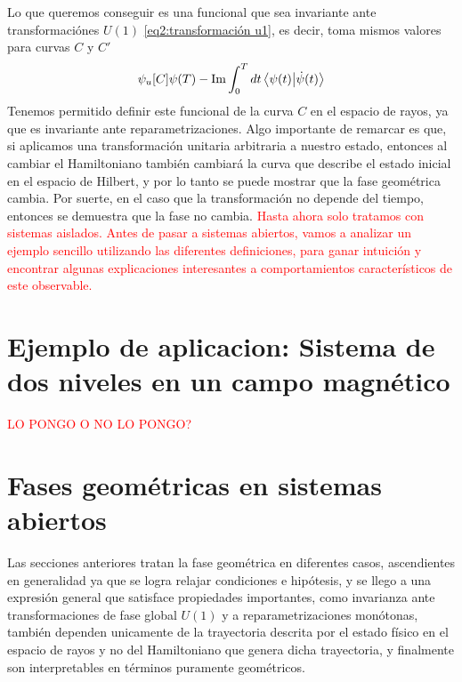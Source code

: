 Lo que queremos conseguir es una funcional que sea invariante ante transformaciónes $U(1)$ \ref{eq2:transformación u1}, es decir, toma mismos valores para curvas $C$ y $C'$
\begin{equation} \label{eq2:fg cinematica unitaria}
    \psi_u[C] \def \arg \braket{\psi(0)}{\psi(T)} - \Im \int_0^T dt \braket{\psi(t)}{\dot \psi(t)}
\end{equation}
Tenemos permitido definir este funcional de la curva $C$ en el espacio de rayos, ya que es invariante ante reparametrizaciones. Algo importante de remarcar es que, si aplicamos una transformación unitaria arbitraria a nuestro estado, entonces al cambiar el Hamiltoniano también cambiará la curva que describe el estado inicial en el espacio de Hilbert, y por lo tanto se puede mostrar que la fase geométrica cambia. Por suerte, en el caso que la transformación no depende del tiempo, entonces se demuestra que la fase no cambia. 
\newline
\textcolor{red}{Hasta ahora solo tratamos con sistemas aislados. Antes de pasar a sistemas abiertos, vamos a analizar un ejemplo sencillo utilizando las diferentes definiciones, para ganar intuición y encontrar algunas explicaciones interesantes a comportamientos característicos de este observable.}

\section{Ejemplo de aplicacion: Sistema de dos niveles en un campo magn\'etico}\label{sec2:ejemplos}

\textcolor{red}{LO PONGO O NO LO PONGO?}

\section{Fases geométricas en sistemas abiertos}\label{sec2:sistemas abiertos}
Las secciones anteriores tratan la fase geométrica en diferentes casos, ascendientes en generalidad ya que se logra relajar condiciones e hipótesis, y se llego a una expresión general que satisface propiedades importantes, como invarianza ante transformaciones de fase global $U(1)$ y a reparametrizaciones monótonas, también dependen unicamente de la trayectoria descrita por el estado físico en el espacio de rayos y no del Hamiltoniano que genera dicha trayectoria, y finalmente son interpretables en términos puramente geométricos. 

